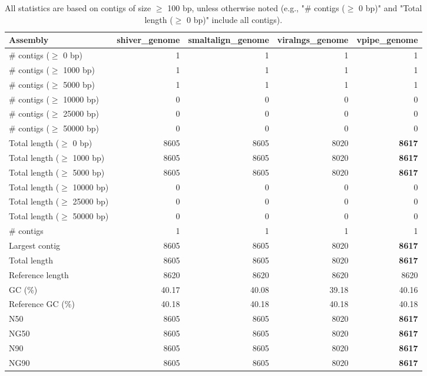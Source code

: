 \documentclass[12pt,a4paper]{article}
\begin{document}
\begin{table}[ht]
\begin{center}
\caption{All statistics are based on contigs of size $\geq$ 100 bp, unless otherwise noted (e.g., "\# contigs ($\geq$ 0 bp)" and "Total length ($\geq$ 0 bp)" include all contigs).}
\begin{tabular}{|l*{4}{|r}|}
\hline
Assembly & shiver\_genome & smaltalign\_genome & viralngs\_genome & vpipe\_genome \\ \hline
\# contigs ($\geq$ 0 bp) & 1 & 1 & 1 & 1 \\ \hline
\# contigs ($\geq$ 1000 bp) & 1 & 1 & 1 & 1 \\ \hline
\# contigs ($\geq$ 5000 bp) & 1 & 1 & 1 & 1 \\ \hline
\# contigs ($\geq$ 10000 bp) & 0 & 0 & 0 & 0 \\ \hline
\# contigs ($\geq$ 25000 bp) & 0 & 0 & 0 & 0 \\ \hline
\# contigs ($\geq$ 50000 bp) & 0 & 0 & 0 & 0 \\ \hline
Total length ($\geq$ 0 bp) & 8605 & 8605 & 8020 & {\bf 8617} \\ \hline
Total length ($\geq$ 1000 bp) & 8605 & 8605 & 8020 & {\bf 8617} \\ \hline
Total length ($\geq$ 5000 bp) & 8605 & 8605 & 8020 & {\bf 8617} \\ \hline
Total length ($\geq$ 10000 bp) & 0 & 0 & 0 & 0 \\ \hline
Total length ($\geq$ 25000 bp) & 0 & 0 & 0 & 0 \\ \hline
Total length ($\geq$ 50000 bp) & 0 & 0 & 0 & 0 \\ \hline
\# contigs & 1 & 1 & 1 & 1 \\ \hline
Largest contig & 8605 & 8605 & 8020 & {\bf 8617} \\ \hline
Total length & 8605 & 8605 & 8020 & {\bf 8617} \\ \hline
Reference length & 8620 & 8620 & 8620 & 8620 \\ \hline
GC (\%) & 40.17 & 40.08 & 39.18 & 40.16 \\ \hline
Reference GC (\%) & 40.18 & 40.18 & 40.18 & 40.18 \\ \hline
N50 & 8605 & 8605 & 8020 & {\bf 8617} \\ \hline
NG50 & 8605 & 8605 & 8020 & {\bf 8617} \\ \hline
N90 & 8605 & 8605 & 8020 & {\bf 8617} \\ \hline
NG90 & 8605 & 8605 & 8020 & {\bf 8617} \\ \hline

\end{tabular}
\end{center}
\end{table}
\end{document}
